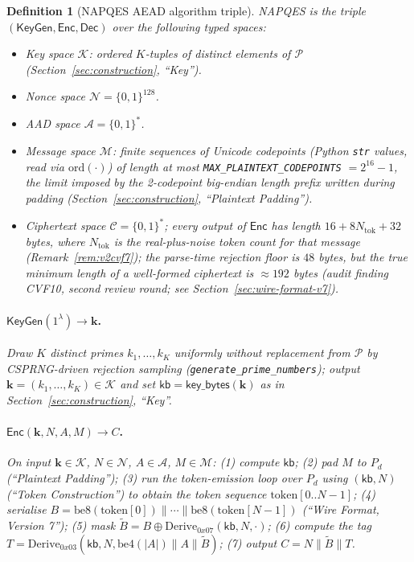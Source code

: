 \documentclass[11pt,a4paper]{article}
\newtheorem{definition}[theorem]{Definition}
\begin{document}
\begin{definition}[NAPQES AEAD algorithm triple]\label{def:aead-triple}
NAPQES is the triple $(\mathsf{KeyGen}, \mathsf{Enc}, \mathsf{Dec})$ over the
following typed spaces:
\begin{itemize}
  \item Key space $\mathcal{K}$: ordered $K$-tuples of distinct elements of
        $\mathcal{P}$ (Section~\ref{sec:construction}, ``Key'').
  \item Nonce space $\mathcal{N} = \{0,1\}^{128}$.
  \item AAD space $\mathcal{A} = \{0,1\}^{*}$.
  \item Message space $\mathcal{M}$: finite sequences of Unicode codepoints
        (Python \texttt{str} values, read via $\mathrm{ord}(\cdot)$) of length
        at most \texttt{MAX\_PLAINTEXT\_CODEPOINTS} $= 2^{16}-1$, the limit
        imposed by the 2-codepoint big-endian length prefix written during
        padding (Section~\ref{sec:construction}, ``Plaintext Padding'').
  \item Ciphertext space $\mathcal{C} = \{0,1\}^{*}$; every output of
        $\mathsf{Enc}$ has length $16 + 8N_{\mathrm{tok}} + 32$ bytes, where
        $N_{\mathrm{tok}}$ is the real-plus-noise token count for that
        message (Remark~\ref{rem:v2cvf7}); the parse-time rejection floor
        is $48$ bytes, but the true minimum length of a well-formed
        ciphertext is $\approx 192$ bytes (audit finding CVF10, second
        review round; see Section~\ref{sec:wire-format-v7}).
\end{itemize}

\paragraph{$\mathsf{KeyGen}(1^{\lambda}) \to \mathbf{k}$.}
Draw $K$ distinct primes $k_1,\ldots,k_K$ uniformly without replacement from
$\mathcal{P}$ by CSPRNG-driven rejection sampling
(\texttt{generate\_prime\_numbers}); output
$\mathbf{k} = (k_1,\ldots,k_K) \in \mathcal{K}$ and set
$\mathsf{kb} = \mathsf{key\_bytes}(\mathbf{k})$ as in
Section~\ref{sec:construction}, ``Key''.

\paragraph{$\mathsf{Enc}(\mathbf{k}, N, A, M) \to C$.}
On input $\mathbf{k}\in\mathcal{K}$, $N\in\mathcal{N}$, $A\in\mathcal{A}$,
$M\in\mathcal{M}$: (1) compute $\mathsf{kb}$; (2) pad $M$ to $P_d$
(``Plaintext Padding''); (3) run the token-emission loop over $P_d$ using
$(\mathsf{kb}, N)$ (``Token Construction'') to obtain the token sequence
$\mathrm{token}[0..N{-}1]$; (4) serialise
$B = \mathrm{be8}(\mathrm{token}[0])\|\cdots\|\mathrm{be8}(\mathrm{token}[N{-}1])$
(``Wire Format, Version 7''); (5) mask
$\widetilde{B} = B \oplus \mathrm{Derive}_{0x07}(\mathsf{kb}, N, \cdot)$;
(6) compute the tag
$T = \mathrm{Derive}_{0x03}(\mathsf{kb}, N, \mathrm{be4}(|A|)\|A\|\widetilde{B})$;
(7) output $C = N \| \widetilde{B} \| T$.


\end{definition}
\end{document}
